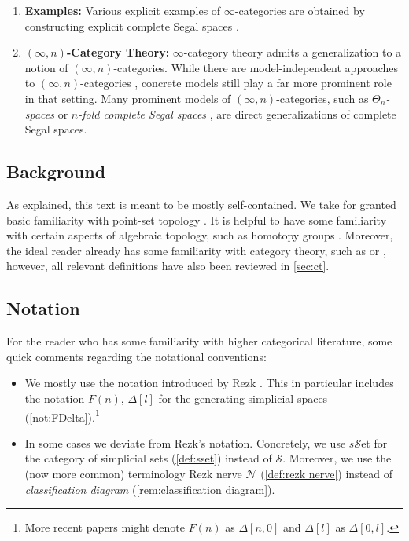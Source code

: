 \documentclass[11pt, a4paper]{amsart}
\newcommand{\sN}{\mathscr{N}}
\newcommand{\sS}{\mathscr{S}}
\newcommand{\sSet}{s\mathscr{S}\mathrm{et}}
\theoremstyle{definition}
\theoremstyle{remark}
\numberwithin{equation}{section}
\begin{document}
\begin{enumerate}[leftmargin=*]
  \item \textbf{Examples:} Various explicit examples of $\infty$-categories are obtained by constructing explicit complete Segal spaces \cite{lurie2009cobordism,calaquescheimbauer2019cobordism,kock2023wholegrainpetri,mukherjeerasekh2022twisted,rasekh2024model}.
  \item \textbf{$(\infty,n)$-Category Theory:} $\infty$-category theory admits a generalization to a notion of $(\infty,n)$-categories. While there are model-independent approaches to $(\infty,n)$-categories \cite{barwickschommerpries2021unicity}, concrete models still play a far more prominent role in that setting. Many prominent models of $(\infty,n)$-categories, such as \emph{$\Theta_n$-spaces} \cite{rezk2010thetanspaces} or \emph{$n$-fold complete Segal spaces} \cite{barwick2005nfoldsegalspaces}, are direct generalizations of complete Segal spaces. 
\end{enumerate}

\subsection{Background}
As explained, this text is meant to be mostly self-contained. We take for granted basic familiarity with point-set topology \cite[Sections 1--7, 9, 12--19, 23]{munkres2000topology}. It is helpful to have some familiarity with certain aspects of algebraic topology, such as homotopy groups \cite[Section 1.1, Section 4.1]{hatcher2002at}. Moreover, the ideal reader already has some familiarity with category theory, such as \cite[Section 1--3]{maclane1998categories} or \cite[Chapter 1--3]{riehl2016context}, however, all relevant definitions have also been reviewed in \cref{sec:ct}.

\subsection{Notation}
For the reader who has some familiarity with higher categorical literature, some quick comments regarding the notational conventions:
\begin{itemize}[leftmargin=*]
  \item We mostly use the notation introduced by Rezk \cite{rezk2001css}. This in particular includes the notation $F(n)$, $\Delta[l]$ for the generating simplicial spaces (\cref{not:FDelta}).\footnote{More recent papers might denote $F(n)$ as $\Delta[n,0]$ and $\Delta[l]$ as $\Delta[0,l]$.}
  \item In some cases we deviate from Rezk's notation. Concretely, we use $\sSet$ for the category of simplicial sets (\cref{def:sset}) instead of $\sS$. Moreover, we use the (now more common) terminology Rezk nerve $\sN$ (\cref{def:rezk nerve}) instead of \emph{classification diagram} (\cref{rem:classification diagram}).
\end{itemize}
\end{document}
